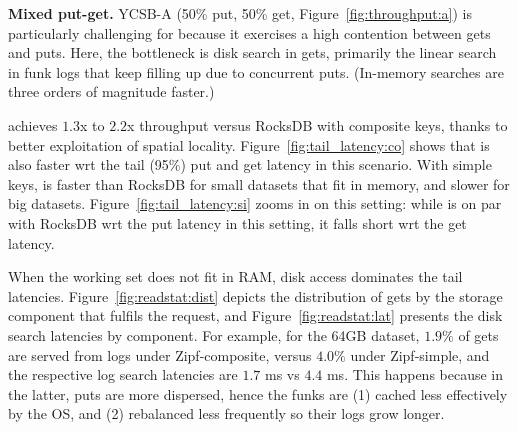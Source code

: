 {\bf Mixed put-get.} YCSB-A (50\% put, 50\% get, Figure~\ref{fig:throughput:a})
 is particularly challenging for \sys\/ because it exercises a high contention between gets and puts. 
Here, the bottleneck is  disk search in gets, primarily the linear search in funk logs 
that keep filling up due to concurrent puts. (In-memory searches are three orders of magnitude faster.)

\sys\/ achieves $1.3$x to $2.2$x throughput versus RocksDB with composite keys, 
thanks to better exploitation of spatial locality. Figure~\ref{fig:tail_latency:co} shows that \sys\/
is also faster wrt the tail (95\%) put and get latency in this scenario. With simple keys,
\sys\/ is faster than RocksDB  for small datasets that fit in memory, and slower for big datasets.  
Figure~\ref{fig:tail_latency:si} zooms in on this setting: while \sys\/ is on par with 
RocksDB wrt the put latency in this setting, it falls short wrt the get latency.

When the working set does not fit in RAM, disk access dominates the tail latencies.
Figure~\ref{fig:readstat:dist} depicts the distribution of gets by the storage  component 
that fulfils the request, and Figure~\ref{fig:readstat:lat} presents the disk search latencies by component. 
For example, for the 64GB dataset, $1.9\%$ of gets are served from logs under Zipf-composite, versus $4.0\%$ under Zipf-simple,
and the respective log search latencies are $1.7$ ms vs $4.4$ ms. This happens because in the latter, puts are more dispersed, 
hence the funks are (1) cached less effectively by the OS, and (2) rebalanced less frequently so their logs grow longer.

